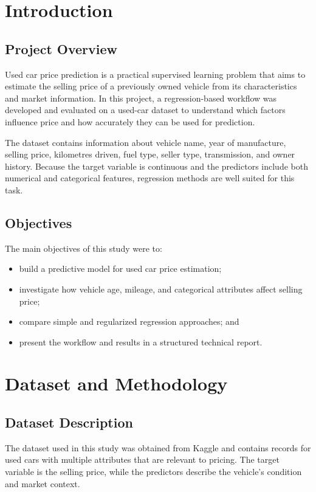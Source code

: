 
\chapter{Introduction}
\section{Project Overview}
Used car price prediction is a practical supervised learning problem that aims to estimate the selling price of a previously owned vehicle from its characteristics and market information. In this project, a regression-based workflow was developed and evaluated on a used-car dataset to understand which factors influence price and how accurately they can be used for prediction.

The dataset contains information about vehicle name, year of manufacture, selling price, kilometres driven, fuel type, seller type, transmission, and owner history. Because the target variable is continuous and the predictors include both numerical and categorical features, regression methods are well suited for this task.

\section{Objectives}
The main objectives of this study were to:
\begin{itemize}
  \item build a predictive model for used car price estimation;
  \item investigate how vehicle age, mileage, and categorical attributes affect selling price;
  \item compare simple and regularized regression approaches; and
  \item present the workflow and results in a structured technical report.
\end{itemize}

\chapter{Dataset and Methodology}
\section{Dataset Description}
The dataset used in this study was obtained from Kaggle and contains records for used cars with multiple attributes that are relevant to pricing. The target variable is the selling price, while the predictors describe the vehicle's condition and market context.

